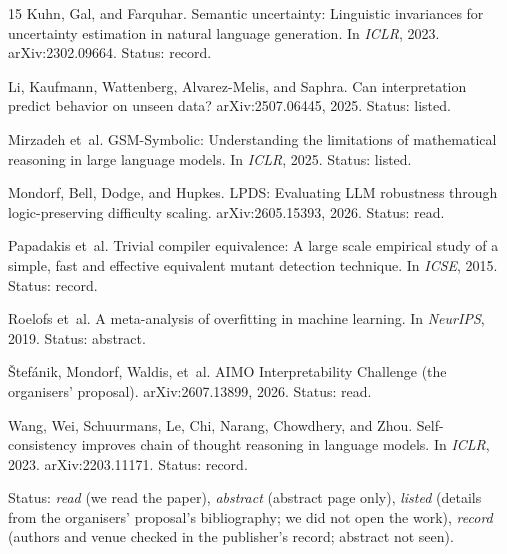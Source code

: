 \documentclass{article}
\begin{document}
\begin{thebibliography}{15}
Kuhn, Gal, and Farquhar.
\newblock Semantic uncertainty: Linguistic invariances for uncertainty estimation in natural language generation.
\newblock In \emph{ICLR}, 2023. arXiv:2302.09664.
\newblock Status: record.

Li, Kaufmann, Wattenberg, Alvarez-Melis, and Saphra.
\newblock Can interpretation predict behavior on unseen data?
\newblock arXiv:2507.06445, 2025.
\newblock Status: listed.

Mirzadeh et~al.
\newblock GSM-Symbolic: Understanding the limitations of mathematical reasoning in large language models.
\newblock In \emph{ICLR}, 2025.
\newblock Status: listed.

Mondorf, Bell, Dodge, and Hupkes.
\newblock LPDS: Evaluating LLM robustness through logic-preserving difficulty scaling.
\newblock arXiv:2605.15393, 2026.
\newblock Status: read.

Papadakis et~al.
\newblock Trivial compiler equivalence: A large scale empirical study of a simple, fast and effective equivalent
mutant detection technique.
\newblock In \emph{ICSE}, 2015.
\newblock Status: record.

Roelofs et~al.
\newblock A meta-analysis of overfitting in machine learning.
\newblock In \emph{NeurIPS}, 2019.
\newblock Status: abstract.

{\v{S}}tef{\'a}nik, Mondorf, Waldis, et~al.
\newblock AIMO Interpretability Challenge (the organisers' proposal).
\newblock arXiv:2607.13899, 2026.
\newblock Status: read.

Wang, Wei, Schuurmans, Le, Chi, Narang, Chowdhery, and Zhou.
\newblock Self-consistency improves chain of thought reasoning in language models.
\newblock In \emph{ICLR}, 2023. arXiv:2203.11171.
\newblock Status: record.

\end{thebibliography}

{\small\noindent Status: \emph{read} (we read the paper), \emph{abstract} (abstract page only), \emph{listed}
(details from the organisers' proposal's bibliography; we did not open the work), \emph{record} (authors and venue
checked in the publisher's record; abstract not seen).\par}
\end{document}
